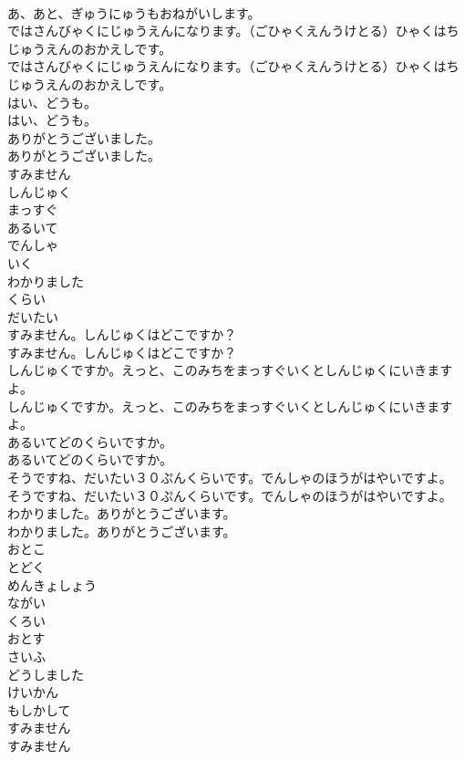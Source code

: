 \documentclass[8pt]{extreport}
\begin{document}
\begin{CJK}{UTF8}{min}
\\	あ、あと、ぎゅうにゅうもおねがいします。
\\	ではさんびゃくにじゅうえんになります。（ごひゃくえんうけとる）ひゃくはちじゅうえんのおかえしです。
\\	ではさんびゃくにじゅうえんになります。（ごひゃくえんうけとる）ひゃくはちじゅうえんのおかえしです。
\\	はい、どうも。
\\	はい、どうも。
\\	ありがとうございました。
\\	ありがとうございました。
\\	すみません
\\	しんじゅく
\\	まっすぐ
\\	あるいて
\\	でんしゃ
\\	いく
\\	わかりました
\\	くらい
\\	だいたい
\\	すみません。しんじゅくはどこですか？
\\	すみません。しんじゅくはどこですか？
\\	しんじゅくですか。えっと、このみちをまっすぐいくとしんじゅくにいきますよ。
\\	しんじゅくですか。えっと、このみちをまっすぐいくとしんじゅくにいきますよ。
\\	あるいてどのくらいですか。
\\	あるいてどのくらいですか。
\\	そうですね、だいたい３０ぷんくらいです。でんしゃのほうがはやいですよ。
\\	そうですね、だいたい３０ぷんくらいです。でんしゃのほうがはやいですよ。
\\	わかりました。ありがとうございます。
\\	わかりました。ありがとうございます。
\\	おとこ
\\	とどく
\\	めんきょしょう
\\	ながい
\\	くろい
\\	おとす
\\	さいふ
\\	どうしました
\\	けいかん
\\	もしかして
\\	すみません
\\	すみません

\end{CJK}
\end{document}
